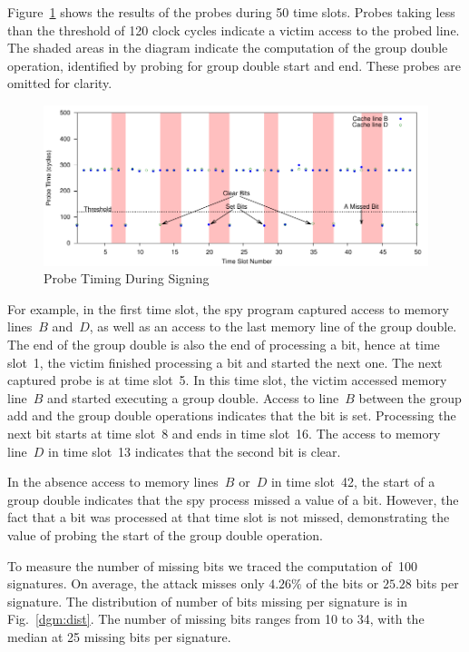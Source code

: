 \documentclass[twocolumn]{svjour3}
\begin{document}
Figure~\ref{dgm:timing} shows the results of the probes during 50 time slots.
Probes taking less than the threshold of 120 clock cycles indicate a victim access to the probed line.
The shaded areas in the diagram indicate the computation of the group double operation, identified
by probing for group double start and end.
These probes are omitted for clarity.


\begin{figure}[htb]
\centering\includegraphics[width=\textwidth]{images/timing}
\caption{Probe Timing During Signing\label{dgm:timing}}
\end{figure}

For example, in the first time slot, the spy program captured access to memory lines~$B$ and~$D$, as well as an access
to the last memory line of the group double.
The end of the group double is also the end of processing a bit, hence at time slot~1, the victim finished processing a bit
and started the next one.
The next captured probe is at time slot~5.
In this time slot, the victim accessed memory line~$B$ and started executing a group double.  
Access to line~$B$ between the group add and the group double operations indicates that the bit is set.
Processing the next bit starts at time slot~8 and ends in time slot~16.
The access to memory line~$D$ in time slot~13 indicates that the second bit is clear.

In the absence access to memory lines~$B$ or~$D$ in time slot~42, the start of a group double indicates
that the spy process missed a value of a bit.
However, the fact that a bit was processed at that time slot is not missed,
demonstrating the value of probing the start of the group double operation.

To measure the number of missing bits we traced the computation of~100 signatures.
On average, the attack misses only $4.26\%$ of the bits or $25.28$ bits per signature.
The distribution of number of bits missing per signature is in Fig.~\ref{dgm:dist}.
The number of missing bits ranges from 10 to 34, with the median at 25 missing bits per signature.
\end{document}
